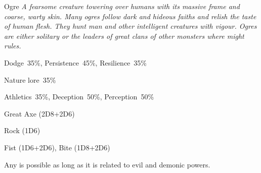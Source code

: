 \begin{monsterbox}{Ogre}
	\textit{A fearsome creature towering over humans with its massive frame and coarse, warty skin. Many ogres follow dark and hideous faiths and relish the taste of human flesh. They hunt man and other intelligent creatures with vigour. Ogres are either solitary or the leaders of great clans of other monsters where might rules.}\\
	\rpghline
	\basics[%
        hitpoints  = 18, %
	majorwound = 9,
	damagemodifier = +2D6,
	powerpoints = 10,
	movementrate = 15m,
	armor = Tough Skin (2AP),
	plunderrating = 1
	]
	\rpghline%
	\stats[ %
		STR = 3D6+12 (23),
		CON = 2D6+6  (13),
		DEX = 3D6    (11),
		SIZ = 3D6+12 (23),
		INT = 2D6+3  (10),
		POW = 2D6+3  (10),
		CHA = 1D6    (3)
	]
	\rpghline%
	\begin{rpg-monsteraction}[Resistances]
		Dodge~35\%, Persistence~45\%, Resilience~35\%
	\end{rpg-monsteraction}
	\begin{rpg-monsteraction}[Knowledge]
		Nature lore~35\%
	\end{rpg-monsteraction}
	\begin{rpg-monsteraction}[Practical]
		Athletics~35\%, Deception~50\%, Perception~50\%
	\end{rpg-monsteraction}
	\begin{rpg-monsteraction}
		Great Axe (2D8+2D6)
	\end{rpg-monsteraction}
	\begin{rpg-monsteraction}
		Rock (1D6)
	\end{rpg-monsteraction}
	\begin{rpg-monsteraction}
		Fist (1D6+2D6), Bite (1D8+2D6)
	\end{rpg-monsteraction}
	\begin{rpg-monsteraction}[Supernatural]
		Any is possible as long as it is related to evil and demonic powers.
	\end{rpg-monsteraction}

\end{monsterbox}

